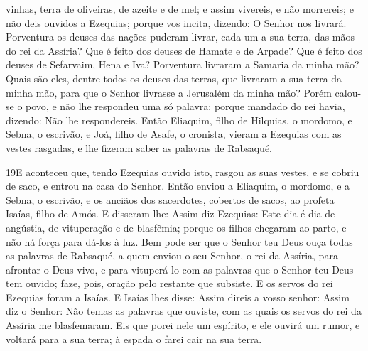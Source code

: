 vinhas, terra de oliveiras, de azeite e de mel; e assim vivereis, e
não morrereis; e não deis ouvidos a Ezequias; porque vos incita,
dizendo: O Senhor nos livrará. Porventura os deuses das
nações puderam livrar, cada um a sua terra, das mãos do rei da
Assíria? Que é feito dos deuses de Hamate e de Arpade? Que é
feito dos deuses de Sefarvaim, Hena e Iva? Porventura livraram a
Samaria da minha mão? Quais são eles, dentre todos os deuses
das terras, que livraram a sua terra da minha mão, para que o Senhor
livrasse a Jerusalém da minha mão?
 Porém calou-se o povo, e não lhe respondeu uma só palavra; porque
mandado do rei havia, dizendo: Não lhe respondereis. Então
Eliaquim, filho de Hilquias, o mordomo, e Sebna, o escrivão, e Joá,
filho de Asafe, o cronista, vieram a Ezequias com as vestes
rasgadas, e lhe fizeram saber as palavras de Rabsaqué.

\medskip

\lettrine{19} E aconteceu que, tendo Ezequias ouvido isto,
rasgou as suas vestes, e se cobriu de saco, e entrou na casa do
Senhor. Então enviou a Eliaquim, o mordomo, e a Sebna, o
escrivão, e os anciãos dos sacerdotes, cobertos de sacos, ao profeta
Isaías, filho de Amós. E disseram-lhe: Assim diz Ezequias: Este
dia é dia de angústia, de vituperação e de blasfêmia; porque os
filhos chegaram ao parto, e não há força para dá-los à luz. Bem
pode ser que o Senhor teu Deus ouça todas as palavras de Rabsaqué, a
quem enviou o seu Senhor, o rei da Assíria, para afrontar o Deus
vivo, e para vituperá-lo com as palavras que o Senhor teu Deus tem
ouvido; faze, pois, oração pelo restante que subsiste. E os
servos do rei Ezequias foram a Isaías. E Isaías lhes disse:
Assim direis a vosso senhor: Assim diz o Senhor: Não temas as
palavras que ouviste, com as quais os servos do rei da Assíria me
blasfemaram. Eis que porei nele um espírito, e ele ouvirá um
rumor, e voltará para a sua terra; à espada o farei cair na sua
terra.

